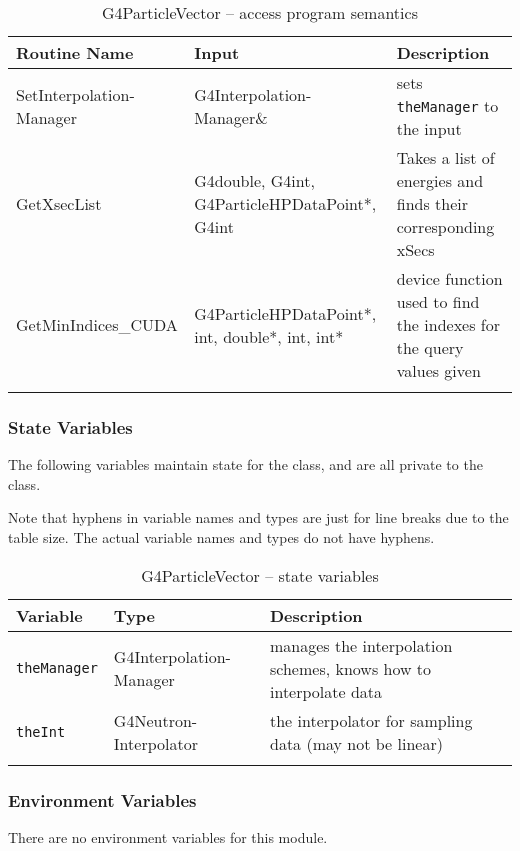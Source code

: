 \documentclass[12pt]{article}
\begin{document}
\begin{longtable}{p{}p{}p{}}
\caption{G4ParticleVector -- access program semantics}\label{Table_NeutronHPVectorSemantics}\\
\toprule
\bf Routine Name & \bf Input & \bf Description \\\midrule
\arrayrulecolor{lightgray}
SetInterpolation-Manager & G4Interpolation-Manager\& & sets \texttt{theManager} to the input \\\hline
GetXsecList & G4double, G4int, G4ParticleHPDataPoint*, G4int & Takes a list of energies and finds their corresponding xSecs\\\hline
GetMinIndices\_CUDA & G4ParticleHPDataPoint*, int, double*, int, int* & device function used to find the indexes for the query values given\\\hline
\arrayrulecolor{black}
\bottomrule
\end{longtable}

\subsubsection{State Variables}%
The following variables maintain state for the class, and are all private to the class.

Note that hyphens in variable names and types are just for line breaks due to the table size. The actual variable names and types do not have hyphens.

\begin{table}[h]
\caption{G4ParticleVector -- state variables}\label{Table_NeutronHPDataPointStateVariables}
\begin{tabularx}{\textwidth}{p{}p{}p{}}
\toprule
\bf Variable & \bf Type & \bf Description\\\midrule
\arrayrulecolor{lightgray}
\texttt{theManager} & G4Interpolation-Manager & manages the interpolation schemes, knows how to interpolate data\\\hline
\texttt{theInt} & G4Neutron-Interpolator & the interpolator for sampling data (may not be linear)\\
\arrayrulecolor{black}
\bottomrule
\end{tabularx}
\end{table}
\subsubsection{Environment Variables}%
There are no environment variables for this module.
\end{document}
